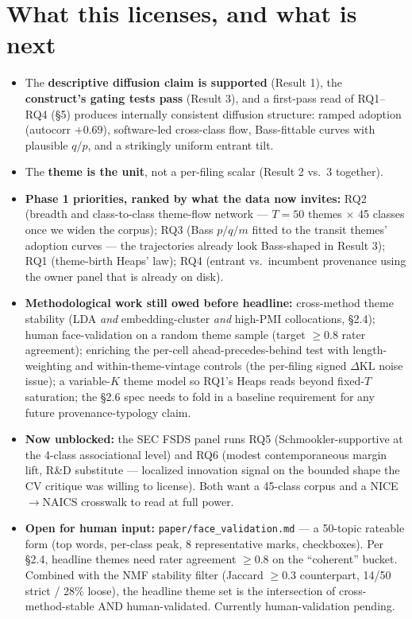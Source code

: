 \documentclass[11pt]{article}
\begin{document}
\section{What this licenses, and what is next}
\begin{itemize}[nosep]
\item The \textbf{descriptive diffusion claim is supported} (Result 1), the
\textbf{construct's gating tests pass} (Result 3), and a first-pass read of
RQ1--RQ4 (§5) produces internally consistent diffusion structure: ramped
adoption (autocorr $+0.69$), software-led cross-class flow, Bass-fittable
curves with plausible $q/p$, and a strikingly uniform entrant tilt.
\item The \textbf{theme is the unit}, not a per-filing scalar (Result 2 vs.\ 3
together).
\item \textbf{Phase 1 priorities, ranked by what the data now invites:}
RQ2 (breadth and class-to-class theme-flow network --- $T=50$ themes
$\times$ 45 classes once we widen the corpus); RQ3 (Bass $p/q/m$ fitted to the
transit themes' adoption curves --- the trajectories already look Bass-shaped
in Result 3); RQ1 (theme-birth Heaps' law); RQ4 (entrant vs.\ incumbent
provenance using the owner panel that is already on disk).
\item \textbf{Methodological work still owed before headline:} cross-method
theme stability (LDA \emph{and} embedding-cluster \emph{and} high-PMI
collocations, §2.4); human face-validation on a random theme sample (target
$\geq 0.8$ rater agreement); enriching the per-cell ahead-precedes-behind test
with length-weighting and within-theme-vintage controls (the per-filing signed
$\Delta\mathrm{KL}$ noise issue); a variable-$K$ theme model so RQ1's Heaps
reads beyond fixed-$T$ saturation; the §2.6 spec needs to fold in a baseline
requirement for any future provenance-typology claim.
\item \textbf{Now unblocked:} the SEC FSDS panel runs RQ5 (Schmookler-supportive
at the 4-class associational level) and RQ6 (modest contemporaneous margin
lift, R\&D substitute --- localized innovation signal on the bounded shape
the CV critique was willing to license). Both want a 45-class corpus and a
NICE$\to$NAICS crosswalk to read at full power.
\item \textbf{Open for human input:} \texttt{paper/face\_validation.md} ---
a 50-topic rateable form (top words, per-class peak, 8 representative marks,
checkboxes). Per §2.4, headline themes need rater agreement $\geq 0.8$ on the
``coherent'' bucket. Combined with the NMF stability filter (Jaccard $\geq 0.3$
counterpart, 14/50 strict / 28\% loose), the headline theme set is the
intersection of cross-method-stable AND human-validated. Currently
human-validation pending.
\end{itemize}
\end{document}
